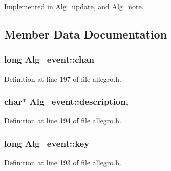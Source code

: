 Implemented in \hyperlink{class_alg__update_ae0f9071d97a94ee6f862d0b511b15f1d}{Alg\+\_\+update}, and \hyperlink{class_alg__note_a04beaa67227bec1e4bf7a74f65f79528}{Alg\+\_\+note}.



\subsection{Member Data Documentation}
\subsubsection[{\texorpdfstring{chan}{chan}}]{\setlength{\rightskip}{0pt plus 5cm}long Alg\+\_\+event\+::chan}\hypertarget{class_alg__event_aad79cff0b92503c9ad4f6fc7a6425d74}{}\label{class_alg__event_aad79cff0b92503c9ad4f6fc7a6425d74}


Definition at line 197 of file allegro.\+h.

\subsubsection[{\texorpdfstring{description}{description}}]{ char$\ast$ Alg\+\_\+event\+::description\hspace{0.3cm}{\ttfamily [static]}, {\ttfamily [protected]}}\hypertarget{class_alg__event_abdeb5a93114d6f08dbeee05620d74c14}{}\label{class_alg__event_abdeb5a93114d6f08dbeee05620d74c14}


Definition at line 194 of file allegro.\+h.

\subsubsection[{\texorpdfstring{key}{key}}]{\setlength{\rightskip}{0pt plus 5cm}long Alg\+\_\+event\+::key\hspace{0.3cm}{\ttfamily [protected]}}\hypertarget{class_alg__event_a8cba29daebc877d00fff5948aeda73f0}{}\label{class_alg__event_a8cba29daebc877d00fff5948aeda73f0}


Definition at line 193 of file allegro.\+h.

